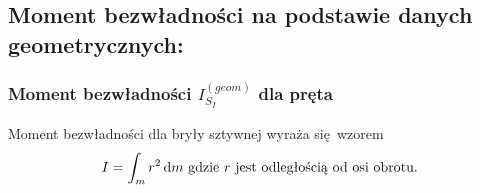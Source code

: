 \documentclass{fizraport}
\begin{document}
\newpage
\subsection{Moment bezwładności na podstawie danych geometrycznych:}

\subsubsection{Moment bezwładności $I_{S_I}^{(geom)}$ dla pręta }%
Moment bezwładności dla bryły sztywnej wyraża się~wzorem
\[I = \int_m{r^2 \operatorname{d\!} m}
\text{ gdzie $r$ jest odległością od osi obrotu.}\]
\end{document}
